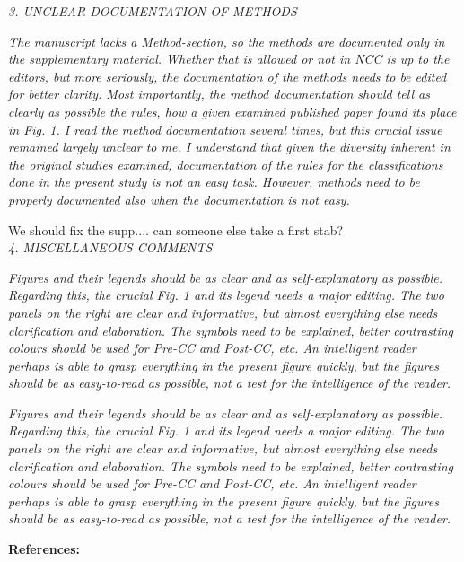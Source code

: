 \documentclass[11pt]{article}
\begin{document}
\emph{3. UNCLEAR DOCUMENTATION OF METHODS}

\emph{The manuscript lacks a Method-section, so the methods are documented only in the supplementary material. Whether that is allowed or not in NCC is up to the editors, but more seriously, the documentation of the methods needs to be edited for better clarity. Most importantly, the method documentation should tell as clearly as possible the rules, how a given examined published paper found its place in Fig. 1. I read the method documentation several times, but this crucial issue remained largely unclear to me. I understand that given the diversity inherent in the original studies examined, documentation of the rules for the classifications done in the present study is not an easy task. However, methods need to be properly documented also when the documentation is not easy.}

We should fix the supp.... can someone else take a first stab? \\

\emph{4. MISCELLANEOUS COMMENTS}

\emph{Figures and their legends should be as clear and as self-explanatory as possible. Regarding this, the crucial Fig. 1 and its legend needs a major editing. The two panels on the right are clear and informative, but almost everything else needs clarification and elaboration. The symbols need to be explained, better contrasting colours should be used for Pre-CC and Post-CC, etc. An intelligent reader perhaps is able to grasp everything in the present figure quickly, but the figures should be as easy-to-read as possible, not a test for the intelligence of the reader.}

\emph{Figures and their legends should be as clear and as self-explanatory as possible. Regarding this, the crucial Fig. 1 and its legend needs a major editing. The two panels on the right are clear and informative, but almost everything else needs clarification and elaboration. The symbols need to be explained, better contrasting colours should be used for Pre-CC and Post-CC, etc. An intelligent reader perhaps is able to grasp everything in the present figure quickly, but the figures should be as easy-to-read as possible, not a test for the intelligence of the reader.}

\newpage
{\bf References:}

\end{document}
